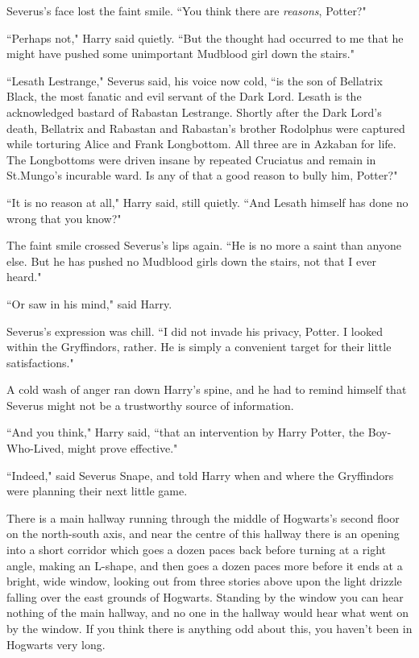 Severus's face lost the faint smile. ``You think there are \emph{reasons}, Potter?"

``Perhaps not," Harry said quietly. ``But the thought had occurred to me that he might have pushed some unimportant Mudblood girl down the stairs."

``Lesath Lestrange," Severus said, his voice now cold, ``is the son of Bellatrix Black, the most fanatic and evil servant of the Dark Lord. Lesath is the acknowledged bastard of Rabastan Lestrange. Shortly after the Dark Lord's death, Bellatrix and Rabastan and Rabastan's brother Rodolphus were captured while torturing Alice and Frank Longbottom. All three are in Azkaban for life. The Longbottoms were driven insane by repeated Cruciatus and remain in St.\?Mungo's incurable ward. Is any of that a good reason to bully him, Potter?"

``It is no reason at all," Harry said, still quietly. ``And Lesath himself has done no wrong that you know?"

The faint smile crossed Severus's lips again. ``He is no more a saint than anyone else. But he has pushed no Mudblood girls down the stairs, not that I ever heard."

``Or saw in his mind," said Harry.

Severus's expression was chill. ``I did not invade his privacy, Potter. I looked within the Gryffindors, rather. He is simply a convenient target for their little satisfactions."

A cold wash of anger ran down Harry's spine, and he had to remind himself that Severus might not be a trustworthy source of information.

``And you think," Harry said, ``that an intervention by Harry Potter, the Boy-Who-Lived, might prove effective."

``Indeed," said Severus Snape, and told Harry when and where the Gryffindors were planning their next little game.

\later

There is a main hallway running through the middle of Hogwarts's second floor on the north-south axis, and near the centre of this hallway there is an opening into a short corridor which goes a dozen paces back before turning at a right angle, making an L-shape, and then goes a dozen paces more before it ends at a bright, wide window, looking out from three stories above upon the light drizzle falling over the east grounds of Hogwarts. Standing by the window you can hear nothing of the main hallway, and no one in the hallway would hear what went on by the window. If you think there is anything odd about this, you haven't been in Hogwarts very long.

